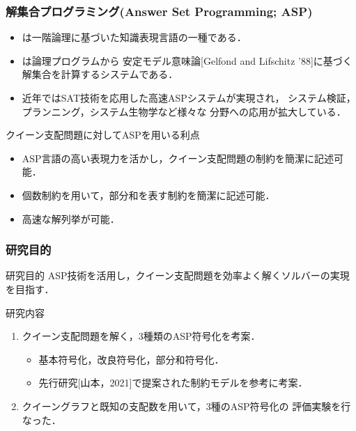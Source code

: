 \documentclass[dvipdfmx,10pt]{beamer}
\begin{document}
%
%

\begin{frame}\frametitle{解集合プログラミング(Answer Set Programming; ASP)}
 \begin{itemize}
  \item {}は一階論理に基づいた知識表現言語の一種である．
  \item {}は論理プログラムから
	安定モデル意味論[Gelfond and Lifschitz '88]に基づく
	解集合を計算するシステムである．
  \item 近年ではSAT技術を応用した高速ASPシステムが実現され，
	システム検証，プランニング，システム生物学など様々な
	分野への応用が拡大している．
 \end{itemize}
 \begin{alertblock}{クイーン支配問題に対してASPを用いる利点}
  \begin{itemize}
   \item ASP言語の高い表現力を活かし，クイーン支配問題の制約を簡潔に記述可能．
   \item 個数制約を用いて，部分和を表す制約を簡潔に記述可能．
   \item 高速な解列挙が可能．
  \end{itemize}
 \end{alertblock}
\end{frame}
 
%
%

\begin{frame}\frametitle{研究目的}
 \begin{alertblock}{研究目的}
  ASP技術を活用し，クイーン支配問題を効率よく解くソルバーの実現を目指す．
 \end{alertblock}
 \begin{block}{研究内容}
  \begin{enumerate}
   \item クイーン支配問題を解く，3種類のASP符号化を考案．
	 \begin{itemize}
	  \item 基本符号化，改良符号化，部分和符号化．
	  \item 先行研究[山本，2021]で提案された制約モデルを参考に考案．
	 \end{itemize}
   \item クイーングラフと既知の支配数を用いて，3種のASP符号化の
	 評価実験を行なった．
  \end{enumerate}
 \end{block}
\end{frame}
\end{document}

